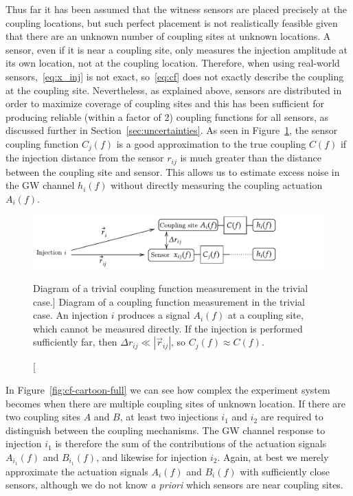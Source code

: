 Thus far it has been assumed that the witness sensors are placed precisely at the coupling locations, but such perfect placement is not realistically feasible given that there are an unknown number of coupling sites at unknown locations.
A sensor, even if it is near a coupling site, only measures the injection amplitude at its own location, not at the coupling location.
Therefore, when using real-world sensors,~\cref{eq:x_inj} is not exact, so~\cref{eq:cf} does not exactly describe the coupling at the coupling site.
Nevertheless, as explained above, sensors are distributed in order to maximize coverage of coupling sites and this has been sufficient for producing reliable (within a factor of 2) coupling functions for all sensors, as discussed further in Section~\ref{sec:uncertainties}.
As seen in Figure~\ref{fig:cf-cartoon-simple}, the sensor coupling function $C_j(f)$ is a good approximation to the true coupling $C(f)$ if the injection distance from the sensor $r_{ij}$ is much greater than the distance between the coupling site and sensor.
This allows us to estimate excess noise in the \ac{GW} channel $h_i(f)$ without directly measuring the coupling actuation $A_i(f)$.

\begin{figure}[h]
	\includegraphics[width=\textwidth]{figures/noise-methods/cf-cartoon-simple.pdf}
	\caption
	[Diagram of a trivial coupling function measurement in the trivial case.]
	{
		Diagram of a coupling function measurement in the trivial case.
		An injection $i$ produces a signal $A_i(f)$ at a coupling site, which cannot be measured directly.
		If the injection is performed sufficiently far, then $\Delta r_{ij} \ll |\vec{r}_{ij}|$, so $C_j(f) \approx C(f)$.
	}
	\label{fig:cf-cartoon-simple}
\end{figure}

In Figure~\ref{fig:cf-cartoon-full} we can see how complex the experiment system becomes when there are multiple coupling sites of unknown location.
If there are two coupling sites $A$ and $B$, at least two injections $i_1$ and $i_2$ are required to distinguish between the coupling mechanisms.
The \ac{GW} channel response to injection $i_1$ is therefore the sum of the contributions of the actuation signals $A_{i_1}(f)$ and $B_{i_1}(f)$, and likewise for injection ${i_2}$.
Again, at best we merely approximate the actuation signals $A_i(f)$ and $B_i(f)$ with sufficiently close sensors, although we do not know \textit{a priori} which sensors are near coupling sites.

